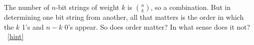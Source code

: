 \documentclass{book}
\begin{document}
\setcounter{project}{117}
\addtocounter{project}{-1}
\begin{activity}[]\label{activity-110}
\hypertarget{p-836}{}%
The number of \(n\)-bit strings of weight \(k\) is \(\binom{n}{k}\), so a combination.  But in determining one bit string from another, all that matters is the order in which the \(k\) 1's and \(n-k\) 0's appear.  So does order matter?  In what sense does it not?%
~\hfill{\tiny\hyperlink{a-117}{[hint]}\hypertarget{q-117}{}}\end{activity}
\end{document}
